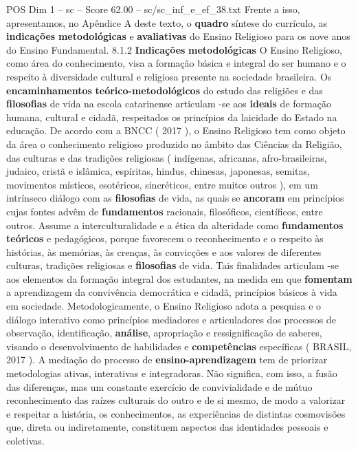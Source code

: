 \begin{textsample}{POS Dim 1 – sc – Score 62.00 – sc/sc\_inf\_e\_ef\_38.txt}
Frente a isso, apresentamos, no Apêndice A deste texto, o \textbf{quadro} síntese do currículo, as \textbf{indicações} \textbf{metodológicas} e \textbf{avaliativas} do Ensino Religioso para os nove anos do Ensino Fundamental. 8.1.2 \textbf{Indicações} \textbf{metodológicas} O Ensino Religioso, como área do conhecimento, visa a formação básica e integral do ser humano e o respeito à diversidade cultural e religiosa presente na sociedade brasileira.
Os \textbf{encaminhamentos} \textbf{teórico-metodológicos} do estudo das religiões e das \textbf{filosofias} de vida na escola catarinense articulam -se aos \textbf{ideais} de formação humana, cultural e cidadã, respeitados os princípios da laicidade do Estado na educação.
De acordo com a BNCC ( 2017 ), o Ensino Religioso tem como objeto da área o conhecimento religioso produzido no âmbito das Ciências da Religião, das culturas e das tradições religiosas ( indígenas, africanas, afro-brasileiras, judaico, cristã e islâmica, espíritas, hindus, chinesas, japonesas, semitas, movimentos místicos, esotéricos, sincréticos, entre muitos outros ), em um intrínseco diálogo com as \textbf{filosofias} de vida, as quais se \textbf{ancoram} em princípios cujas fontes advêm de \textbf{fundamentos} racionais, filosóficos, científicos, entre outros.
Assume a interculturalidade e a ética da alteridade como \textbf{fundamentos} \textbf{teóricos} e pedagógicos, porque favorecem o reconhecimento e o respeito às histórias, às memórias, às crenças, às convicções e aos valores de diferentes culturas, tradições religiosas e \textbf{filosofias} de vida.
Tais finalidades articulam -se aos elementos da formação integral dos estudantes, na medida em que \textbf{fomentam} a aprendizagem da convivência democrática e cidadã, princípios básicos à vida em sociedade.
Metodologicamente, o Ensino Religioso adota a pesquisa e o diálogo interativo como princípios mediadores e articuladores dos processos de observação, identificação, \textbf{análise}, apropriação e ressignificação de saberes, visando o desenvolvimento de habilidades e \textbf{competências} específicas ( BRASIL, 2017 ).
A mediação do processo de \textbf{ensino-aprendizagem} tem de priorizar metodologias ativas, interativas e integradoras.
Não significa, com isso, a fusão das diferenças, mas um constante exercício de convivialidade e de mútuo reconhecimento das raízes culturais do outro e de si mesmo, de modo a valorizar e respeitar a história, os conhecimentos, as experiências de distintas cosmovisões que, direta ou indiretamente, constituem aspectos das identidades pessoais e coletivas.

\end{textsample}
